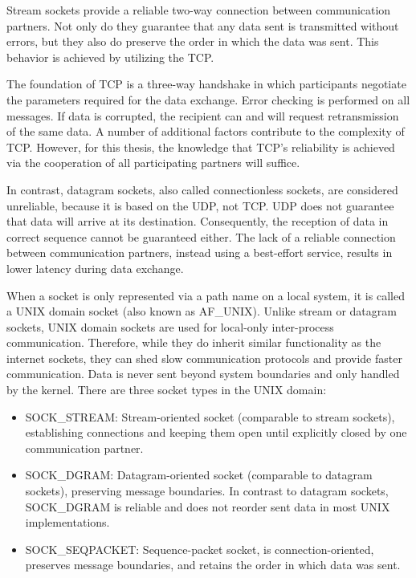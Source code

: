 Stream sockets provide a reliable two-way connection between communication partners.
Not only do they guarantee that any data sent is transmitted without errors, but they also do preserve the order in which the data was sent.
This behavior is achieved by utilizing the \ac{TCP}.\cite{beej:sockets}

The foundation of \ac{TCP} is a three-way handshake in which participants negotiate the parameters required for the data exchange.
Error checking is performed on all messages.
If data is corrupted, the recipient can and will request retransmission of the same data.
A number of additional factors contribute to the complexity of \ac{TCP}.
However, for this thesis, the knowledge that \ac{TCP}'s reliability is achieved via the cooperation of all participating partners will suffice.

In contrast, datagram sockets, also called connectionless sockets, are considered unreliable, because it is based on the \ac{UDP}, not \ac{TCP}.
\ac{UDP} does not guarantee that data will arrive at its destination.
Consequently, the reception of data in correct sequence cannot be guaranteed either.
The lack of a reliable connection between communication partners, instead using a best-effort service, results in lower latency during data exchange.\cite{beej:sockets}

When a socket is only represented via a path name on a local system, it is called a UNIX domain socket (also known as AF\_UNIX).
Unlike stream or datagram sockets, UNIX domain sockets are used for local-only inter-process communication.
Therefore, while they do inherit similar functionality as the internet sockets, they can shed slow communication protocols and provide faster communication.
Data is never sent beyond system boundaries and only handled by the kernel.
There are three socket types in the UNIX domain\cite{man:unixsockets}:
\begin{itemize}
    \itemsep0em
    \item SOCK\_STREAM\@: Stream-oriented socket (comparable to stream sockets), establishing connections and keeping them open until explicitly closed by one communication partner.
    \item SOCK\_DGRAM\@: Datagram-oriented socket (comparable to datagram sockets), preserving message boundaries. In contrast to datagram sockets, SOCK\_DGRAM is reliable and does not reorder sent data in most UNIX implementations.
    \item SOCK\_SEQPACKET\@: Sequence-packet socket, is connection-oriented, preserves message boundaries, and retains the order in which data was sent.
\end{itemize}

